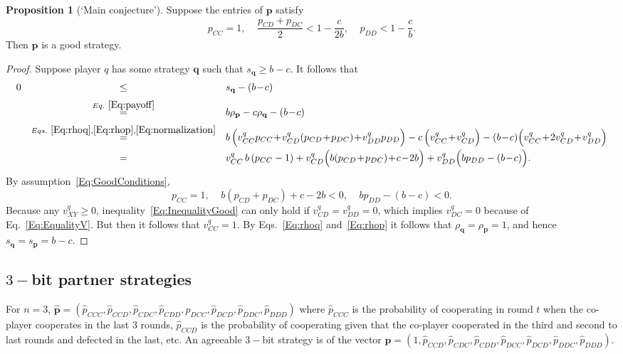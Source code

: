 \documentclass{article}
\theoremstyle{definition}
\newtheorem{Prop}{Proposition}
\begin{document}
 \begin{Prop}[`Main conjecture']
 Suppose the entries of $\mathbf{p}$ satisfy 
 \begin{equation} \label{Eq:GoodConditions}
 p_{CC}\!=\!1,~~~~~\frac{p_{CD}+p_{DC}}{2} \!<\! 1\!-\!\frac{c}{2b},~~~~~p_{DD}<1\!-\!\frac{c}{b}.
 \end{equation} 
 Then $\mathbf{p}$ is a good strategy. 
 \end{Prop}
\begin{proof}
Suppose player $q$ has some strategy $\mathbf{q}$ such that $s_\mathbf{q} \ge b\!-\!c$. It follows that
\begin{equation} \label{Eq:InequalityGood}
\begin{array}{rcl}
0 	&\le	&s_\mathbf{q}-(b\!-\!c)\\[0.2cm]
	&\stackrel{Eq.~\eqref{Eq:payoff}}{=}	&b\rho_\mathbf{p} - c\rho_\mathbf{q}-(b\!-\!c)\\[0.2cm]
	&\stackrel{Eqs.~\eqref{Eq:rhoq}, \eqref{Eq:rhop}, \eqref{Eq:normalization}}{=}	&b\,\Big( v^q_{CC} p_{CC} \!+\!  v^q_{CD}(p_{CD}\!+\!p_{DC}) \!+\! v^q_{DD} p_{DD}\Big) 
		- c\,\Big(v^q_{CC} \!+\! v^q_{CD}\Big) - (b\!-\!c)\Big(v^q_{CC} \!+\!  2v^q_{CD} \!+\! v^q_{DD}\Big)\\[0.2cm]
	&=	&v^q_{CC} \,b\,(p_{CC}-1) + v^q_{CD}\Big(b(p_{CD}\!+\!p_{DC})\!+\!c\!-\!2b\Big) + v^q_{DD}\Big(bp_{DD}-(b\!-\!c)\Big).
\end{array}
\end{equation}
By assumption~\eqref{Eq:GoodConditions},
\begin{equation}
p_{CC}=1,~~~~~b(p_{CD}\!+\!p_{DC})\!+\!c\!-\!2b<0,~~~~~bp_{DD}-(b\!-\!c)<0.
\end{equation}
Because any $v^q_{XY}\!\ge\!0$, inequality~\eqref{Eq:InequalityGood} can only hold if $v^q_{CD}\!=\!v^q_{DD}\!=\!0$, which implies $v^q_{DC}\!=\!0$ because of Eq.~\eqref{Eq:EqualityV}. But then it follows that $v^q_{CC}\!=\!1$. By Eqs.~\eqref{Eq:rhoq} and~\eqref{Eq:rhop} it follows that $\rho_\mathbf{q}\!=\!\rho_\mathbf{p}\!=\!1$, and hence $s_\mathbf{q}\!=\!s_\mathbf{p}\!=\!b\!-\!c$. 
\end{proof}

\subsection{$3-$bit partner strategies}

For $n=3$, $\mathbf{\hat{p}}=(\hat{p}_{CCC}, \hat{p}_{CCD}, \hat{p}_{CDC},
\hat{p}_{CDD}, \hat{p}_{DCC}, \hat{p}_{DCD}, \hat{p}_{DDC}, \hat{p}_{DDD})$
where $\hat{p}_{CCC}$ is the probability of cooperating in round $t$ when the
co-player cooperates in the last 3 rounds, $\hat{p}_{CCD}$ is the probability of
cooperating given that the co-player cooperated in the third and second to last
rounds and defected in the last, etc. An agreeable $3-$bit strategy is of the
vector $\mathbf{\hat{p}}=(1, \hat{p}_{CCD}, \hat{p}_{CDC}, \hat{p}_{CDD},
\hat{p}_{DCC}, \hat{p}_{DCD}, \hat{p}_{DDC}, \hat{p}_{DDD})$.
\end{document}
